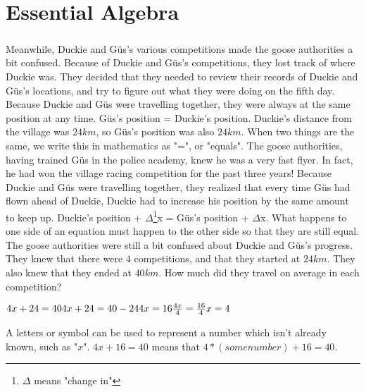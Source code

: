 \chapter{Essential Algebra}
\paragraph{} Meanwhile, Duckie and Güs's various competitions made the goose authorities a bit confused. Because of Duckie and Güs's competitions, they lost track of where Duckie was. They decided that they needed to review their records of Duckie and Güs's locations, and try to figure out what they were doing on the fifth day. 
\vfill
\pagebreak
{Because Duckie and Güs were travelling together, they were always at the same position at any time.}
{Güs's position = Duckie's position. Duckie's distance from the village was $24km$, so Güs's position was also $24km$.}
{When two things are the same, we write this in mathematics as "=", or "equals".}
{}
{The goose authorities, having trained Güs in the police academy, knew he was a very fast flyer. In fact, he had won the village racing competition for the past three years! Because Duckie and Güs were travelling together, they realized that every time Güs had flown ahead of Duckie, Duckie had to increase his position by the same amount to keep up.}
{Duckie's position + $\Delta$\footnote{$\Delta$ means "change in"}x = Güs's position + $\Delta$x.}
{What happens to one side of an equation must happen to the other side so that they are still equal.}
{}
{The goose authorities were still a bit confused about Duckie and Güs's progress. They knew that there were $4$ competitions, and that they started at $24 km$. They also knew that they ended at $40 km$. How much did they travel on average in each competition?}
{\begin{center}$4x + 24 = 40 \linebreak 4x + 24 = 40 - 24 \linebreak 4x = 16 \linebreak \frac{4x}{4} = \frac{16}{4} \linebreak x = 4  $\end{center}}
{A letters or symbol can be used to represent a number which isn’t already known, such as "$x$". $4x + 16 = 40$ means that $4\ast(some number) + 16 = 40$.}
{}